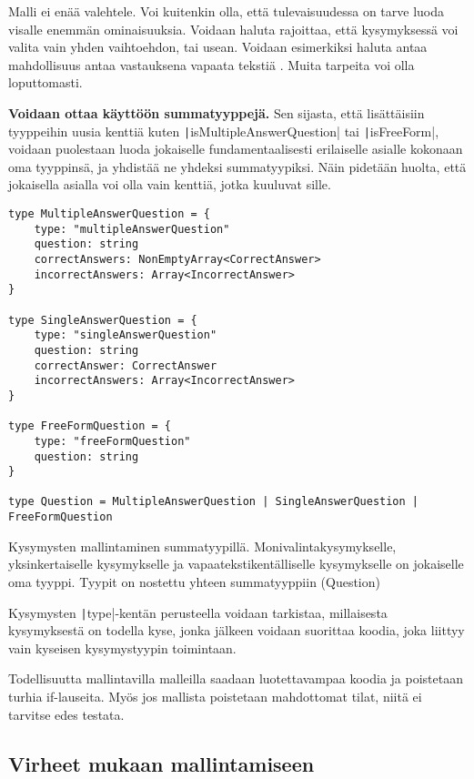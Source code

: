 Malli ei enää valehtele. Voi kuitenkin olla, että tulevaisuudessa on tarve luoda visalle enemmän ominaisuuksia. Voidaan haluta rajoittaa, että kysymyksessä voi valita vain yhden vaihtoehdon, tai usean. Voidaan esimerkiksi haluta antaa mahdollisuus antaa vastauksena vapaata tekstiä \cite{impossiblebetter}. Muita tarpeita voi olla loputtomasti.

\textbf{Voidaan ottaa käyttöön summatyyppejä.} Sen sijasta, että lisättäisiin tyyppeihin uusia kenttiä kuten \texttt|isMultipleAnswerQuestion| tai \texttt|isFreeForm|, voidaan puolestaan luoda jokaiselle fundamentaalisesti erilaiselle asialle kokonaan oma tyyppinsä, ja yhdistää ne yhdeksi summatyypiksi. Näin pidetään huolta, että jokaisella asialla voi olla vain kenttiä, jotka kuuluvat sille.

\begin{code}
    \begin{verbatim}
type MultipleAnswerQuestion = {
    type: "multipleAnswerQuestion"
    question: string
    correctAnswers: NonEmptyArray<CorrectAnswer>
    incorrectAnswers: Array<IncorrectAnswer>
}

type SingleAnswerQuestion = {
    type: "singleAnswerQuestion"
    question: string
    correctAnswer: CorrectAnswer
    incorrectAnswers: Array<IncorrectAnswer>
}

type FreeFormQuestion = {
    type: "freeFormQuestion"
    question: string
}

type Question = MultipleAnswerQuestion | SingleAnswerQuestion | FreeFormQuestion
    \end{verbatim}
    \caption{Kysymysten mallintaminen summatyypillä. Monivalintakysymykselle, yksinkertaiselle kysymykselle ja vapaatekstikentälliselle kysymykselle on jokaiselle oma tyyppi. Tyypit on nostettu yhteen summatyyppiin (Question)}
    \label{code:ts_sum_type_nice}
\end{code}

Kysymysten \texttt|type|-kentän perusteella voidaan tarkistaa, millaisesta kysymyksestä on todella kyse, jonka jälkeen voidaan suorittaa koodia, joka liittyy vain kyseisen kysymystyypin toimintaan.

Todellisuutta mallintavilla malleilla saadaan luotettavampaa koodia ja poistetaan turhia if-lauseita. Myös jos mallista poistetaan mahdottomat tilat, niitä ei tarvitse edes testata.

\subsection{Virheet mukaan mallintamiseen}

